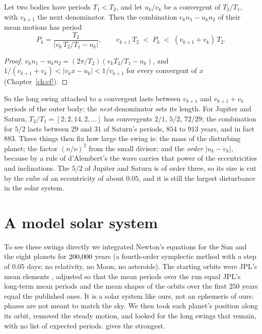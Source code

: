 \begin{proposition}\label{prop:nw-bracket}
Let two bodies have periods $T_1 < T_2$, and let $u_k/v_k$ be a convergent of $T_2/T_1$, with $v_{k+1}$ the next denominator. Then the combination $v_k n_1 - u_k n_2$ of their mean motions has period
\[
P_k = \frac{T_2}{|v_k\,T_2/T_1 - u_k|}, \qquad v_{k+1}\,T_2 \;<\; P_k \;<\; (v_{k+1} + v_k)\,T_2 .
\]
\end{proposition}

\begin{proof}
$v_k n_1 - u_k n_2 = (2\pi/T_2)(v_k T_2/T_1 - u_k)$, and $1/(v_{k+1} + v_k) < |v_k x - u_k| < 1/v_{k+1}$ for every convergent of $x$ (Chapter~\ref{ch:cf}).
\end{proof}

So the long swing attached to a convergent lasts between $v_{k+1}$ and $v_{k+1} + v_k$ periods of the outer body: the \emph{next} denominator sets its length. For Jupiter and Saturn, $T_2/T_1 = [2; 2, 14, 2, \ldots]$ has convergents $2/1$, $5/2$, $72/29$; the combination for $5/2$ lasts between $29$ and $31$ of Saturn's periods, $854$ to $913$ years, and in fact $883$. Three things then fix how large the swing is: the mass of the disturbing planet; the factor $(n/\nu)^2$ from the small divisor; and the \emph{order} $|u_k - v_k|$, because by a rule of d'Alembert's the wave carries that power of the eccentricities and inclinations. The $5/2$ of Jupiter and Saturn is of order three, so its size is cut by the cube of an eccentricity of about $0.05$, and it is still the largest disturbance in the solar system.

\section{A model solar system}\label{sec:nw-sim}

To see these swings directly we integrated Newton's equations for the Sun and the eight planets for $200{,}000$ years (a fourth-order symplectic method \citep{Yoshida1990} with a step of $0.05$ days; no relativity, no Moon, no asteroids). The starting orbits were JPL's mean elements \citep{standish1992}, adjusted so that the mean periods over the run equal JPL's long-term mean periods and the mean shapes of the orbits over the first $250$ years equal the published ones. It is a solar system like ours, not an ephemeris of ours: phases are not meant to match the sky. We then took each planet's position along its orbit, removed the steady motion, and looked for the long swings that remain, with no list of expected periods.  gives the strongest.

